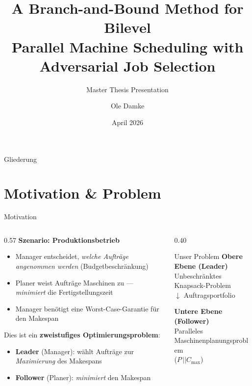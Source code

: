\documentclass[fleqn,11pt,aspectratio=43]{beamer}
\title[B\&B for Bilevel Parallel Machine Scheduling]{%
  A Branch-and-Bound Method for Bilevel\\
  Parallel Machine Scheduling with\\
  Adversarial Job Selection}
\subtitle{Master Thesis Presentation}
\author{Ole Damke}
\institute{Institut für Mathematische Optimierung\\
  Technische Universität Braunschweig}
\date{April 2026}
\newcommand{\Cmax}{C_{\max}}
\begin{document}

\begin{frame}[plain]
  \titlepage
\end{frame}

\begin{frame}{Gliederung}
  \tableofcontents
\end{frame}

\section{Motivation \& Problem}

\begin{frame}[shrink=5]{Motivation}
  \begin{columns}[T]
    \begin{column}{0.57\textwidth}
      \textbf{Szenario: Produktionsbetrieb}
      \begin{itemize}
        \item Manager entscheidet, \emph{welche Aufträge angenommen werden} (Budgetbeschränkung)
        \item Planer weist Aufträge Maschinen zu — \emph{minimiert} die Fertigstellungszeit
        \item Manager benötigt eine Worst-Case-Garantie für den Makespan
      \end{itemize}
      Dies ist ein \textbf{zweistufiges Optimierungsproblem}:
      \begin{itemize}
        \item \textbf{Leader} (Manager): wählt Aufträge zur \emph{Maximierung} des Makespans
        \item \textbf{Follower} (Planer): \emph{minimiert} den Makespan
      \end{itemize}
    \end{column}
    \begin{column}{0.40\textwidth}
      \begin{block}{Unser Problem}
        \textbf{Obere Ebene (Leader)}\\
        Unbeschränktes Knapsack-Problem\\[0.25em]
        \centering$\downarrow$ Auftragsportfolio\\[0.25em]
        \raggedright\textbf{Untere Ebene (Follower)}\\
        Paralleles Maschinenplanungsproblem\\
        ($P\,||\Cmax$)
      \end{block}
    \end{column}
  \end{columns}
\end{frame}
\end{document}

